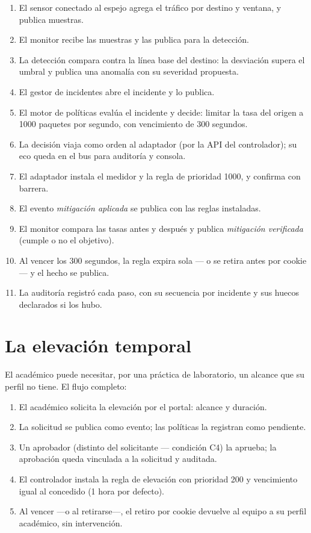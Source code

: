 \documentclass[11pt,a4paper]{article}
\begin{document}
\begin{enumerate}
\item El sensor conectado al espejo agrega el tráfico por destino y ventana, y publica muestras.
\item El monitor recibe las muestras y las publica para la detección.
\item La detección compara contra la línea base del destino: la desviación supera el umbral y publica una anomalía con su severidad propuesta.
\item El gestor de incidentes abre el incidente y lo publica.
\item El motor de políticas evalúa el incidente y decide: limitar la tasa del origen a 1000 paquetes por segundo, con vencimiento de 300 segundos.
\item La decisión viaja como orden al adaptador (por la API del controlador); su eco queda en el bus para auditoría y consola.
\item El adaptador instala el medidor y la regla de prioridad 1000, y confirma con barrera.
\item El evento \emph{mitigación aplicada} se publica con las reglas instaladas.
\item El monitor compara las tasas antes y después y publica \emph{mitigación verificada} (cumple o no el objetivo).
\item Al vencer los 300 segundos, la regla expira sola --- o se retira antes por cookie --- y el hecho se publica.
\item La auditoría registró cada paso, con su secuencia por incidente y sus huecos declarados si los hubo.
\end{enumerate}

\section{La elevación temporal}



El académico puede necesitar, por una práctica de laboratorio, un alcance que su perfil no tiene. El flujo completo:

\begin{enumerate}
\item El académico solicita la elevación por el portal: alcance y duración.
\item La solicitud se publica como evento; las políticas la registran como pendiente.
\item Un aprobador (distinto del solicitante --- condición C4) la aprueba; la aprobación queda vinculada a la solicitud y auditada.
\item El controlador instala la regla de elevación con prioridad 200 y vencimiento igual al concedido (1 hora por defecto).
\item Al vencer ---o al retirarse---, el retiro por cookie devuelve al equipo a su perfil académico, sin intervención.
\end{enumerate}
\end{document}
